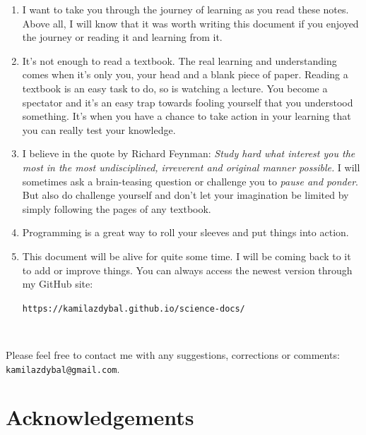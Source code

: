 \documentclass[10pt]{report}
\begin{document}
\begin{enumerate}
\item I want to take you through the journey of learning as you read these notes. Above all, I will know that it was worth writing this document if you enjoyed the journey or reading it and learning from it.
\item It's not enough to read a textbook. The real learning and understanding comes when it's only you, your head and a blank piece of paper. Reading a textbook is an easy task to do, so is watching a lecture. You become a spectator and it's an easy trap towards fooling yourself that you understood something. It's when you have a chance to take action in your learning that you can really test your knowledge.
\item I believe in the quote by Richard Feynman: \textit{Study hard what interest you the most in the most undisciplined, irreverent and original manner possible.} I will sometimes ask a brain-teasing question or challenge you to \textit{pause and ponder}. But also do challenge yourself and don't let your imagination be limited by simply following the pages of any textbook.
\item Programming is a great way to roll your sleeves and put things into action.
\item This document will be alive for quite some time. I will be coming back to it to add or improve things. You can always access the newest version through my GitHub site:

\verb|https://kamilazdybal.github.io/science-docs/|
\end{enumerate}

\,\,

Please feel free to contact me with any suggestions, corrections or comments: \verb|kamilazdybal@gmail.com|.


\newpage
\chapter*{Acknowledgements}
\thispagestyle{empty}

{\fontsize{12}{12}}

\vspace*{0.5cm}

{\fontsize{12}{12}}

\vspace*{0.5cm}
\end{document}
